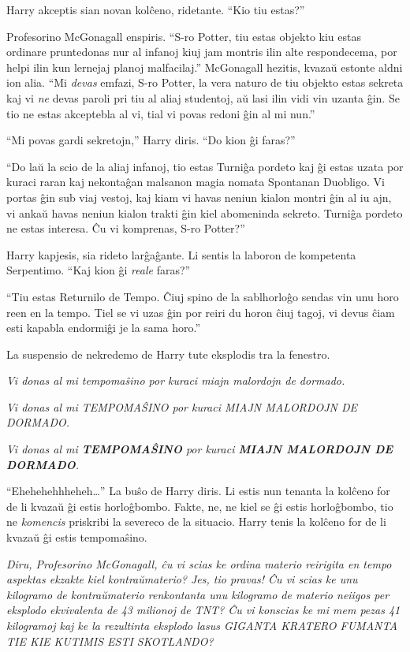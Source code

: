 Harry akceptis sian novan kolĉeno, ridetante. ``Kio tiu estas?''

Profesorino McGonagall enspiris. ``S-ro Potter, tiu estas objekto kiu
estas ordinare pruntedonas nur al infanoj kiuj jam montris ilin alte
respondecema, por helpi ilin kun lernejaj planoj malfacilaj.''
McGonagall hezitis, kvazaŭ estonte aldni ion alia. ``Mi \emph{devas}
emfazi, S-ro Potter, la vera naturo de tiu objekto estas sekreta kaj
vi \emph{ne} devas paroli pri tiu al aliaj studentoj, aŭ lasi ilin
vidi vin uzanta ĝin. Se tio ne estas akceptebla al vi, tial vi povas
redoni ĝin al mi nun.''

``Mi povas gardi sekretojn,'' Harry diris. ``Do kion ĝi faras?''

``Do laŭ la scio de la aliaj infanoj, tio estas Turniĝa pordeto kaj ĝi
estas uzata por kuraci raran kaj nekontaĝan malsanon magia nomata
Spontanan Duobligo. Vi portas ĝin sub viaj vestoj, kaj kiam vi havas
neniun kialon montri ĝin al iu ajn, vi ankaŭ havas neniun kialon
trakti ĝin kiel abomeninda sekreto. Turniĝa pordeto ne estas
interesa. Ĉu vi komprenas, S-ro Potter?''

Harry kapjesis, sia rideto larĝaĝante. Li sentis la laboron de
kompetenta Serpentimo. ``Kaj kion ĝi \emph{reale} faras?''

``Tiu estas Returnilo de Tempo. Ĉiuj spino de la sablhorloĝo sendas
vin unu horo reen en la tempo. Tiel se vi uzas ĝin por reiri du horon
ĉiuj tagoj, vi devus ĉiam esti kapabla endormiĝi je la sama horo.''

La suspensio de nekredemo de Harry tute eksplodis tra la fenestro.

\emph{Vi donas al mi tempomaŝino por kuraci miajn malordojn de dormado.}

\emph{Vi donas al mi TEMPOMAŜINO por kuraci MIAJN MALORDOJN DE DORMADO.}

\emph{Vi donas al mi \textbf{TEMPOMAŜINO} por kuraci \textbf{MIAJN MALORDOJN DE DORMADO}.}

``Ehehehehhheheh\ldots'' La buŝo de Harry diris. Li estis nun tenanta
la kolĉeno for de li kvazaŭ ĝi estis horloĝbombo. Fakte, ne, ne kiel
se ĝi estis horloĝbombo, tio ne \emph{komencis} priskribi la severeco
de la situacio. Harry tenis la kolĉeno for de li kvazaŭ ĝi estis
tempomaŝino.

\emph{Diru, Profesorino McGonagall, ĉu vi scias ke ordina materio
reirigita en tempo aspektas ekzakte kiel kontraŭmaterio? Jes, tio
pravas! Ĉu vi scias ke unu kilogramo de kontraŭmaterio renkontanta unu
kilogramo de materio neiigos per eksplodo ekvivalenta de 43 milionoj
de TNT? Ĉu vi konscias ke mi mem pezas 41 kilogramoj kaj ke la
rezultinta eksplodo lasus GIGANTA KRATERO FUMANTA TIE KIE KUTIMIS ESTI
SKOTLANDO?}

